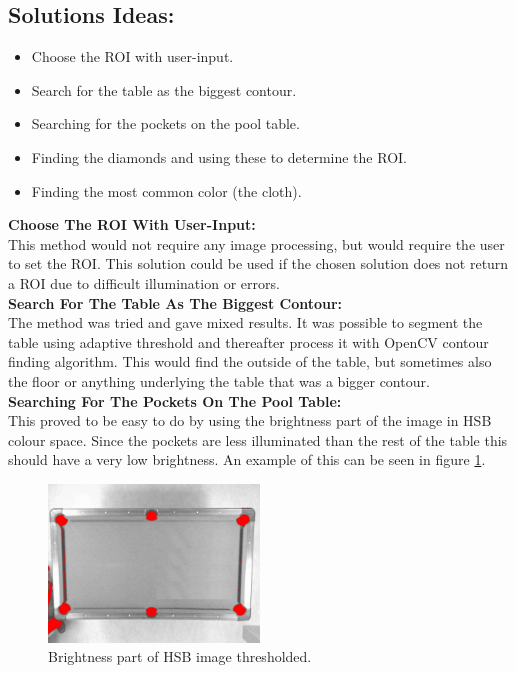 \subsection{Solutions Ideas:}

\begin{itemize}
\setlength{\itemsep}{0mm}
	\item Choose the ROI with user-input.
	\item Search for the table as the biggest contour.
	\item Searching for the pockets on the pool table.
	\item Finding the diamonds and using these to determine the ROI.
	\item Finding the most common color (the cloth).
\end{itemize}

\textbf{Choose The ROI With User-Input:}\\
This method would not require any image processing, but would require the user to set the ROI. This solution could be used if the chosen solution does not return a ROI due to difficult illumination or errors.\\

\textbf{Search For The Table As The Biggest Contour:}\\
The method was tried and gave mixed results. It was possible to segment the table using adaptive threshold and thereafter process it with OpenCV  contour finding algorithm. This would find the outside of the table, but sometimes also the floor or anything underlying the table that was a bigger contour. \\

\textbf{Searching For The Pockets On The Pool Table:}\\
This proved to be easy to do by using the brightness part of the image in HSB colour space. Since the pockets are less illuminated than the rest of the table this should have a very low brightness. An example of this can be seen in figure \ref{fig:value_thres}. 

\begin{figure}[H]
\begin{center}
\leavevmode
\includegraphics[width=0.5\textwidth]{images/value_thres}
\end{center}
\caption{Brightness part of HSB image thresholded.}
\label{fig:value_thres}
\end{figure}

